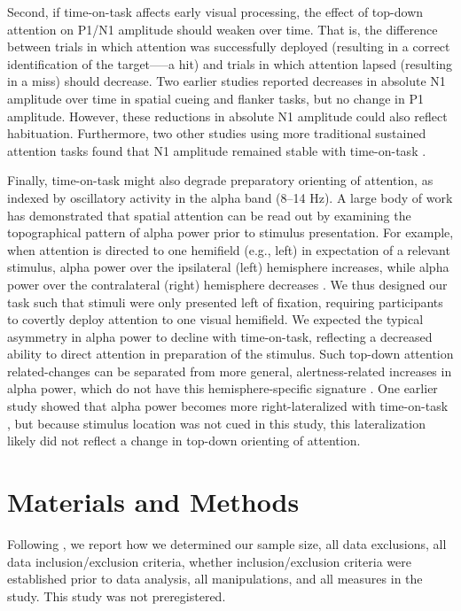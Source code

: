 \documentclass[11pt,english,]{memoir}
\begin{document}
Second, if time-on-task affects early visual processing, the effect of top-down attention on P1/N1 amplitude should weaken over time. That is, the difference between trials in which attention was successfully deployed (resulting in a correct identification of the target-----a hit) and trials in which attention lapsed (resulting in a miss) should decrease. Two earlier studies reported decreases in absolute N1 amplitude over time in spatial cueing \autocite{Boksem2005} and flanker \autocite{Faber2012} tasks, but no change in P1 amplitude. However, these reductions in absolute N1 amplitude could also reflect habituation. Furthermore, two other studies using more traditional sustained attention tasks found that N1 amplitude remained stable with time-on-task \autocites{Bonnefond2010}{Koelega1992}.

Finally, time-on-task might also degrade preparatory orienting of attention, as indexed by oscillatory activity in the alpha band (8--14 Hz). A large body of work has demonstrated that spatial attention can be read out by examining the topographical pattern of alpha power prior to stimulus presentation. For example, when attention is directed to one hemifield (e.g., left) in expectation of a relevant stimulus, alpha power over the ipsilateral (left) hemisphere increases, while alpha power over the contralateral (right) hemisphere decreases \autocites{Sauseng2005}{Thut2006}{Worden2000}. We thus designed our task such that stimuli were only presented left of fixation, requiring participants to covertly deploy attention to one visual hemifield. We expected the typical asymmetry in alpha power to decline with time-on-task, reflecting a decreased ability to direct attention in preparation of the stimulus. Such top-down attention related-changes can be separated from more general, alertness-related increases in alpha power, which do not have this hemisphere-specific signature \autocites{Cajochen1995}{Drapeau2004}. One earlier study showed that alpha power becomes more right-lateralized with time-on-task \autocite{Newman2013}, but because stimulus location was not cued in this study, this lateralization likely did not reflect a change in top-down orienting of attention.

\hypertarget{MFBrain-methods}{%
\section{Materials and Methods}\label{MFBrain-methods}}

Following \textcite{Simmons2012}, we report how we determined our sample size, all data exclusions, all data inclusion/exclusion criteria, whether inclusion/exclusion criteria were established prior to data analysis, all manipulations, and all measures in the study. This study was not preregistered.
\end{document}
